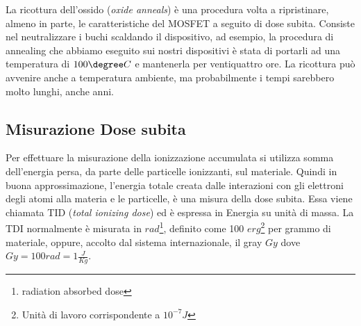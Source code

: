 La ricottura dell'ossido (\textit{oxide anneals}) è una procedura volta a ripristinare, almeno in parte, le caratteristiche del MOSFET a seguito di dose subita.
Consiste nel neutralizzare i buchi scaldando il dispositivo, ad esempio, la procedura di annealing che abbiamo eseguito sui nostri dispositivi è stata di portarli ad una temperatura di $100\degree C$ e mantenerla per ventiquattro ore. La ricottura può avvenire anche a temperatura ambiente, ma probabilmente i tempi sarebbero molto lunghi, anche anni\cite{bib:Effetti_Radiazioni_NASA}. 


\subsection{Misurazione Dose subita}
Per effettuare la misurazione della ionizzazione accumulata si utilizza somma dell'energia persa, da parte delle particelle ionizzanti, sul materiale. Quindi in buona approssimazione, l'energia totale creata dalle interazioni con gli elettroni degli atomi alla materia e le particelle, è una misura della dose subita\cite{bib:Effetti_Radiazioni_NASA}. Essa viene chiamata TID (\textit{total ionizing dose}) ed è espressa in Energia su unità di massa.
La TDI normalmente è misurata in $rad$\footnote{radiation absorbed dose}, definito come 100 $erg$\footnote{Unità di lavoro corrispondente a $10^{-7} J$} per grammo di materiale, oppure, accolto dal sistema internazionale, il gray $Gy$ dove $Gy = 100rad = 1\frac{J}{Kg}$.



